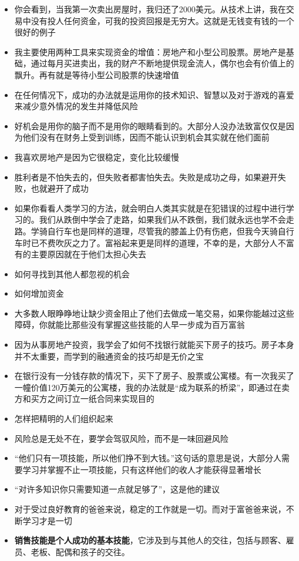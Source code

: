 \documentclass[UTF8,a4paper,8pt]{ctexart}
\begin{document}
\begin{itemize}
 	\item 你会看到，当我第一次卖出房屋时，我归还了2000美元。从技术上讲，我在交易中没有投人任何资金，可我的投资回报是无穷大。这就是无钱变有钱的一个很好的例子
 	\item 我主要使用两种工具来实现资金的增值：房地产和小型公司股票。房地产是基础，通过每月买进卖出，我的财产不断地提供现金流人，偶尔也会有价值上的飘升。再有就是等待小型公司股票的快速增值
 	\item 在任何情况下，成功的办法就是运用你的技术知识、智慧以及对于游戏的喜爱来减少意外情况的发生并降低风险
 	\item 好机会是用你的脑子而不是用你的眼睛看到的。大部分人没办法致富仅仅是因为他们没有在财务上受到训练，因而不能认识到机会其实就在他们面前
 	\item 我喜欢房地产是因为它很稳定，变化比较缓慢
 	\item 胜利者是不怕失去的，但失败者都害怕失去。失败是成功之母，如果避开失败，也就避开了成功
 	\item 如果你看看人类学习的方法，就会明白人类其实就是在犯错误的过程中进行学习的。我们从跌倒中学会了走路，如果我们从不跌倒，我们就永远也学不会走路。学骑自行车也是同样的道理，尽管我的膝盖上仍有伤疤，但我今天骑自行车时已不费吹灰之力了。富裕起来更是同样的道理，不幸的是，大部分人不富有的主要原因就在于他们太担心失去
 	\item 如何寻找到其他人都忽视的机会
 	\item 如何增加资金
 	\item 大多数人眼睁睁地让缺少资金阻止了他们去做成一笔交易，如果你能越过这些障碍，你就能比那些没有掌握这些技能的人早一步成为百万富翁
 	\item 因为从事房地产投资，我学会了如何不找银行就能买下房子的技巧。房子本身并不太重要，而学到的融通资金的技巧却是无价之宝
 	\item 在银行没有一分钱存款的情况下，买下了房子、股票或公寓楼。有一次我买了一幢价值120万美元的公寓楼，我的办法就是“成为联系的桥梁”，即通过在卖方和买方之间订立一纸合同来实现目的
 	\item 怎样把精明的人们组织起来
 	\item 风险总是无处不在，要学会驾驭风险，而不是一味回避风险
 	\item “他们只有一项技能，所以他们挣不到大钱。”这句话的意思是说，大部分人需要学习并掌握不止一项技能，只有这样他们的收人才能获得显著增长
 	\item “对许多知识你只需要知道一点就足够了”，这是他的建议
 	\item 对于受过良好教育的爸爸来说，稳定的工作就是一切。而对于富爸爸来说，不断学习才是一切
 	\item \textbf{销售技能是个人成功的基本技能}，它涉及到与其他人的交往，包括与顾客、雇员、老板、配偶和孩子的交往。
 	

\end{itemize}
\end{document}
